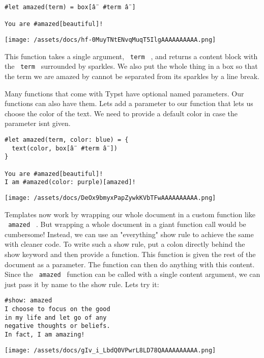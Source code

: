 \begin{verbatim}
#let amazed(term) = box[â¨ #term â¨]

You are #amazed[beautiful]!
\end{verbatim}

\texttt{[image: /assets/docs/hf-0MuyTNtENvqMuqT5IlgAAAAAAAAAA.png]}

This function takes a single argument, \texttt{\ term\ } , and returns a
content block with the \texttt{\ term\ } surrounded by sparkles. We also
put the whole thing in a box so that the term we are amazed by cannot be
separated from its sparkles by a line break.

Many functions that come with Typst have optional named parameters. Our
functions can also have them. Let\textquotesingle s add a parameter to
our function that lets us choose the color of the text. We need to
provide a default color in case the parameter isn\textquotesingle t
given.

\begin{verbatim}
#let amazed(term, color: blue) = {
  text(color, box[â¨ #term â¨])
}

You are #amazed[beautiful]!
I am #amazed(color: purple)[amazed]!
\end{verbatim}

\texttt{[image: /assets/docs/DeOx9bmyxPapZywkKVbTFwAAAAAAAAAA.png]}

Templates now work by wrapping our whole document in a custom function
like \texttt{\ amazed\ } . But wrapping a whole document in a giant
function call would be cumbersome! Instead, we can use an "everything"
show rule to achieve the same with cleaner code. To write such a show
rule, put a colon directly behind the show keyword and then provide a
function. This function is given the rest of the document as a
parameter. The function can then do anything with this content. Since
the \texttt{\ amazed\ } function can be called with a single content
argument, we can just pass it by name to the show rule.
Let\textquotesingle s try it:

\begin{verbatim}
#show: amazed
I choose to focus on the good
in my life and let go of any
negative thoughts or beliefs.
In fact, I am amazing!
\end{verbatim}

\texttt{[image: /assets/docs/gIv\_i\_LbdQ0VPwrL8LD78QAAAAAAAAAA.png]}

